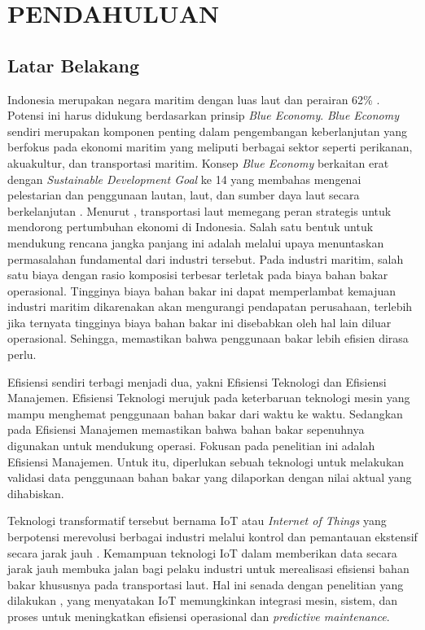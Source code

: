 \chapter{PENDAHULUAN}

\section{Latar Belakang}

Indonesia merupakan negara maritim dengan luas laut dan perairan 62\% \parencite{inproc:wuryadani}. Potensi ini harus didukung berdasarkan prinsip \textit{Blue Economy}. \textit{Blue Economy} sendiri merupakan komponen penting dalam pengembangan keberlanjutan yang berfokus pada ekonomi maritim yang meliputi berbagai sektor seperti perikanan, akuakultur, dan transportasi maritim. Konsep \textit{Blue Economy} berkaitan erat dengan \textit{Sustainable Development Goal} ke 14 yang membahas mengenai pelestarian dan penggunaan lautan, laut, dan sumber daya laut secara berkelanjutan \parencite{misc:lse}. Menurut \textcite{misc:dephub}, transportasi laut memegang peran strategis untuk mendorong pertumbuhan ekonomi di Indonesia. Salah satu bentuk untuk mendukung rencana jangka panjang ini adalah melalui upaya menuntaskan permasalahan fundamental dari industri tersebut. Pada industri maritim, salah satu biaya dengan rasio komposisi terbesar terletak pada biaya bahan bakar operasional. Tingginya biaya bahan bakar ini dapat memperlambat kemajuan industri maritim dikarenakan akan mengurangi pendapatan perusahaan, terlebih jika ternyata tingginya biaya bahan bakar ini disebabkan oleh hal lain diluar operasional. Sehingga, memastikan bahwa penggunaan bakar lebih efisien dirasa perlu.

Efisiensi sendiri terbagi menjadi dua, yakni Efisiensi Teknologi dan Efisiensi Manajemen. Efisiensi Teknologi merujuk pada keterbaruan teknologi mesin yang mampu menghemat penggunaan bahan bakar dari waktu ke waktu. Sedangkan pada Efisiensi Manajemen memastikan bahwa bahan bakar sepenuhnya digunakan untuk mendukung operasi. Fokusan pada penelitian ini adalah Efisiensi Manajemen. Untuk itu, diperlukan sebuah teknologi untuk melakukan validasi data penggunaan bahan bakar yang dilaporkan dengan nilai aktual yang dihabiskan.

Teknologi transformatif tersebut bernama IoT atau \textit{Internet of Things} yang berpotensi merevolusi berbagai industri melalui kontrol dan pemantauan ekstensif secara jarak jauh \parencite{article:hercog}. Kemampuan teknologi IoT dalam memberikan data secara jarak jauh membuka jalan bagi pelaku industri untuk merealisasi efisiensi bahan bakar khususnya pada transportasi laut. Hal ini senada dengan penelitian yang dilakukan \textcite{article:suciu}, yang menyatakan IoT memungkinkan integrasi mesin, sistem, dan proses untuk meningkatkan efisiensi operasional dan \textit{predictive maintenance}.

